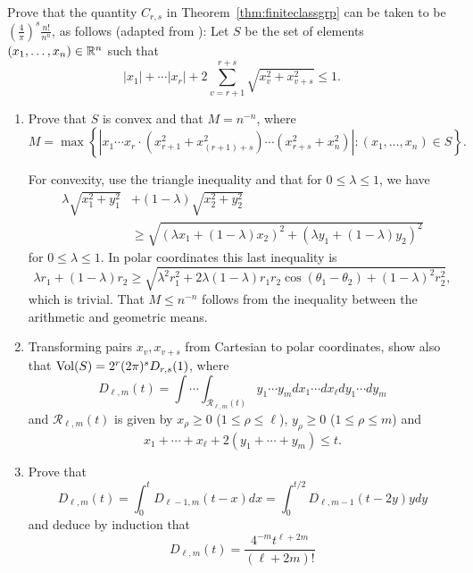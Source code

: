 \begin{exercise}\label{ex:canchooseSright}
	Prove that the quantity $C_{r,s}$ in Theorem~\ref{thm:finiteclassgrp}
	can be taken to be $\left(\frac{4}{\pi}\right)^{s} \frac{n!}{n^n}$,
	as follows (adapted from \cite[pg.~19]{sd:brief}):
	Let $S$ be the set of elements $(x_1,\ldots, x_{n})\in\mathbb{R}^n$ such that
	$$
		|x_1| + \cdots |x_{r}| +
		2 \sum_{v=r+1}^{r+s} \sqrt{x_v^2 + x_{v+s}^2} \leq 1.
	$$
	\begin{enumerate}
		\item Prove that $S$ is convex and that $M=n^{-n}$, where 
		$$
			M = \max\left\{
			\left|x_1 \cdots x_r
			\cdot (x_{r+1}^2 + x_{(r+1)+s}^2) \cdots (x_{r+s}^2 + x_n^2)\right|
			\colon (x_1,\ldots, x_n) \in S
			\right\}.
		$$

		\begin{hint}
			For convexity, use the triangle inequality and that for
			$0\leq \lambda \leq 1$, we have
			\begin{align*}
				\lambda\sqrt{x_1^2 + y_1^2} &+ (1-\lambda)\sqrt{x_2^2+y_2^2} \\
				&\geq\sqrt{(\lambda x_1 + (1 - \lambda)x_2)^2
				+ (\lambda y_1 + (1 - \lambda)y_2)^2}
			\end{align*}
			for $0\leq \lambda \leq 1$.  In polar coordinates this last inequality
			is 
			$$
				\lambda r_1 + (1-\lambda)r_2 \geq  \sqrt{
				\lambda^2 r_1^2
				+ 2\lambda(1 - \lambda) r_1 r_2 \cos(\theta_1 - \theta_2)
				+ (1 - \lambda)^2 r_2^2
				},
			$$
			which is trivial.  That $M\leq n^{-n}$ follows from the inequality
			between the arithmetic and geometric means.
		\end{hint}
		\item Transforming pairs $x_v, x_{v+s}$ from Cartesian to polar coordinates,
		show also that $\operatorname{Vol}(S) = 2^{r}(2\pi)^s D_{r,s}(1)$, where
		$$
			D_{\ell,m}(t) = \int \cdots \int_{\mathcal{R}_{\ell,m}(t)}
			y_1 \cdots y_m dx_1 \cdots dx_{\ell} dy_1 \cdots dy_m
		$$
		and 
		$\mathcal{R}_{\ell,m}(t)$ is given by $x_{\rho}\geq 0$
		($1\leq \rho\leq \ell$), $y_{\rho}\geq 0$ ($1\leq \rho\leq m$) and 
		$$
			x_1 + \cdots + x_{\ell} + 2(y_1+\cdots +y_m) \leq t.
		$$
		\item Prove that
		$$
			D_{\ell,m}(t) = \int_{0}^t D_{\ell-1,m}(t-x)dx
			= \int_{0}^{t/2} D_{\ell,m-1}(t-2y)y dy
		$$
		and deduce by induction that 
		$$
			D_{\ell,m}(t) = \frac{4^{-m}t^{\ell+2m}}{(\ell+2m)!}
		$$
	\end{enumerate}
\end{exercise}

